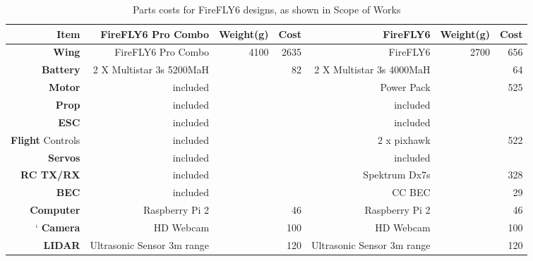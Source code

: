 \begin{landscape}
	\begin{table}[!htbp]
		\centering
		\caption{Parts costs for FireFLY6 designs, as shown in Scope of Works}
		\begin{tabular}{|r|r|r|r|r|r|r|}
			\hline
			\textbf{Item}            & \textbf{FireFLY6 Pro Combo}   & \textbf{Weight(g)} & \textbf{Cost} & \textbf{FireFLY6} & \textbf{Weight(g)} & \textbf{Cost}\\
			\hline
			\textbf{Wing}            & FireFLY6 Pro Combo        & 4100       & 2635  & FireFLY6                  & 2700       & 656   \\
			\hline
			\textbf{Battery}         & 2 X Multistar 3s 5200MaH   &            & 82    & 2 X Multistar 3s 4000MaH   &            & 64    \\
			\hline
			\textbf{Motor}           & included                   &            &       & Power Pack                 &            & 525   \\
			\hline
			\textbf{Prop}            & included                   &            &       & included                   &            &       \\
			\hline
			\textbf{ESC}             & included                   &            &       & included                   &            &       \\
			\hline
			\textbf{Flight} Controls & included                   &            &       & 2 x pixhawk                &            & 522   \\
			\hline
			\textbf{Servos}          & included                   &            &       & included                   &            &       \\
			\hline
			\textbf{RC TX/RX}        & included                   &            &       & Spektrum Dx7s              &            & 328   \\
			\hline
			\textbf{BEC}             & included                   &            &       & CC BEC                     &            & 29    \\
			\hline
			\textbf{Computer}        & Raspberry Pi 2             &            & 46    & Raspberry Pi 2             &            & 46    \\
			\hline`
			\textbf{Camera}          & HD Webcam                  &            & 100   & HD Webcam                  &            & 100   \\
			\hline
			\textbf{LIDAR}           & Ultrasonic Sensor 3m range &            & 120   & Ultrasonic Sensor 3m range &            & 120   \\

\end{tabular}
\end{table}
\end{landscape}
